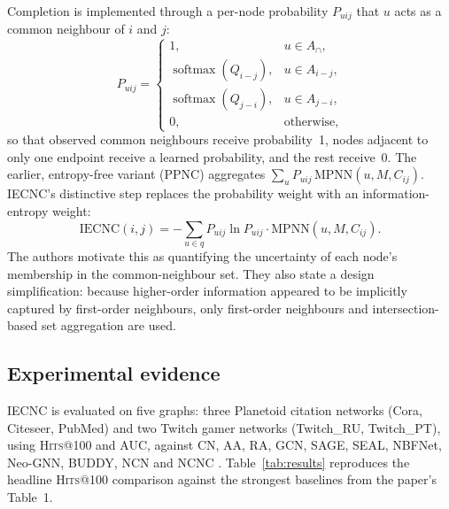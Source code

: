 \documentclass[11pt,a4paper]{article}
\makeatletter
\newcommand{\hits}{\textsc{Hits}@100}
\makeatother
\begin{document}
Completion is implemented through a per-node probability $P_{uij}$ that $u$ acts as a
common neighbour of $i$ and $j$:
\begin{equation}
P_{uij}=
\begin{cases}
1, & u\in A_\cap,\\
\operatorname{softmax}(Q_{i-j}), & u\in A_{i-j},\\
\operatorname{softmax}(Q_{j-i}), & u\in A_{j-i},\\
0, & \text{otherwise,}
\end{cases}
\end{equation}
so that observed common neighbours receive probability~1, nodes adjacent to only one
endpoint receive a learned probability, and the rest receive~0. The earlier, entropy-free
variant (PPNC) aggregates $\sum_u P_{uij}\,\mathrm{MPNN}(u,M,C_{ij})$. IECNC's distinctive step
replaces the probability weight with an information-entropy weight:
\begin{equation}
\mathrm{IECNC}(i,j)=-\sum_{u\in q}P_{uij}\ln P_{uij}\cdot \mathrm{MPNN}(u,M,C_{ij}).
\end{equation}
The authors motivate this as quantifying the uncertainty of each node's membership in the common-neighbour
set. They also state a design simplification: because higher-order information appeared to be
implicitly captured by first-order neighbours, only first-order neighbours and intersection-based
set aggregation are used.

\subsection{Experimental evidence}
IECNC is evaluated on five graphs: three Planetoid citation networks (Cora, Citeseer, PubMed)
and two Twitch gamer networks (Twitch\_RU, Twitch\_PT), using \hits{} and AUC, against
CN, AA, RA, GCN, SAGE, SEAL, NBFNet, Neo-GNN, BUDDY, NCN and NCNC \cite{zhou2025iecnc}.
Table~\ref{tab:results} reproduces the headline \hits{} comparison against the strongest baselines
from the paper's Table~1.
\end{document}
